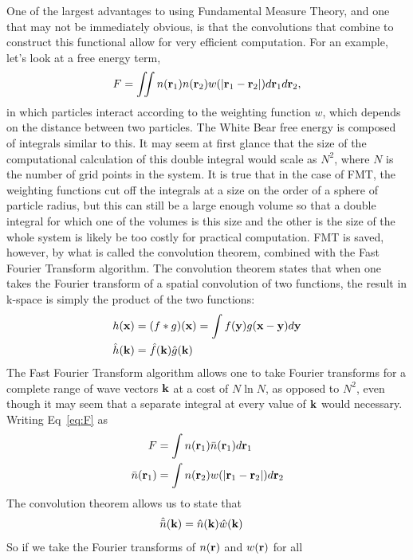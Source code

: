 One of the largest advantages to using Fundamental Measure Theory, and
one that may not be immediately obvious, is that the convolutions that
combine to construct this functional allow for very efficient
computation. 
For an example, let's look at a free energy term,
\begin{align}
F = \iint n(\textbf{r}_1)n(\textbf{r}_2)w(|\textbf{r}_1-\textbf{r}_2|)d\textbf{r}_1 d\textbf{r}_2,
\label{eq:F}
\end{align}
in which particles interact according to the weighting function $w$,
which depends on the distance between two particles.  The White Bear
free energy is composed of integrals similar to this.  It may seem at
first glance that the size of the computational calculation of this
double integral would scale as $N^2$, where $N$ is the number of grid
points in the system.  It is true that in the case of FMT, the
weighting functions cut off the integrals at a size on the order of a
sphere of particle radius, but this can still be a large enough volume
so that a double integral for which one of the volumes is this size
and the other is the size of the whole system is likely be too costly
for practical computation.  FMT is saved, however, by what is called
the convolution theorem, combined with the Fast Fourier Transform
algorithm.  The convolution theorem states that when one takes the
Fourier transform of a spatial convolution of two functions, the
result in k-space is simply the product of the two functions:
\begin{align}
h(\textbf{x}) &= (f\ast g)(\textbf{x}) = \int f(\textbf{y})g(\textbf{x}-\textbf{y})d\textbf{y}\\
\hat{h}(\textbf{k}) &= \hat{f}(\textbf{k})\hat{g}(\textbf{k})
\end{align}
The Fast Fourier Transform algorithm allows one to take Fourier
transforms for a complete range of wave vectors $\textbf{k}$ at a cost of
$N \ln N$, as opposed to $N^2$, even though it may seem that a
separate integral at every value of $\textbf{k}$ would necessary.  Writing
Eq~\ref{eq:F} as
\begin{align}
F &= \int n(\textbf{r}_1)\bar{n}(\textbf{r}_1)d\textbf{r}_1\\
\bar{n}(\textbf{r}_1) &= \int n(\textbf{r}_2)w(|\textbf{r}_1-\textbf{r}_2|)d\textbf{r}_2
\end{align}
The convolution theorem allows us to state that
\begin{align}
\hat{\bar{n}}(\textbf{k}) &= \hat{n}(\textbf{k})\hat{w}(\textbf{k})
\end{align}
So if we take the Fourier transforms of $n(\textbf{r})$ and $w(\textbf{r})$ for all
